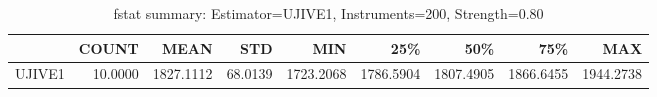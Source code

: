 \begin{table}[ht]
\centering
\caption{fstat summary: Estimator=UJIVE1, Instruments=200, Strength=0.80}
\begin{tabular}{lrrrrrrrr}
\toprule
 & COUNT & MEAN & STD & MIN & 25\% & 50\% & 75\% & MAX \\
\midrule
UJIVE1 & 10.0000 & 1827.1112 & 68.0139 & 1723.2068 & 1786.5904 & 1807.4905 & 1866.6455 & 1944.2738 \\
\bottomrule
\end{tabular}
\end{table}
